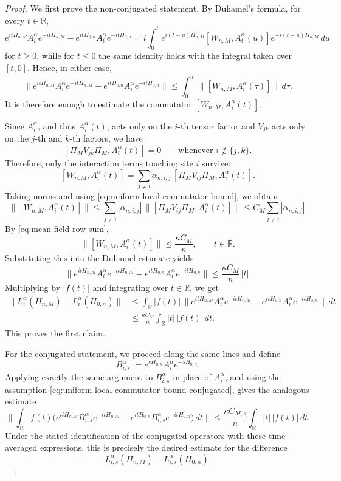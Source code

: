 \documentclass[11pt]{amsart}
\newcommand{\1}{\mathbbm{1}}
\theoremstyle{plain}
\theoremstyle{definition}
\theoremstyle{remark}
\numberwithin{equation}{section}
\begin{document}
\begin{proof}
We first prove the non-conjugated statement. By Duhamel's formula, for every \(t\in\mathbb R\),
\[
e^{itH_{n,M}}A_i^\alpha e^{-itH_{n,M}}-e^{itH_{0,n}}A_i^\alpha e^{-itH_{0,n}}
=
i\int_0^t e^{i(t-u)H_{n,M}}[W_{n,M},A_i^\alpha(u)]e^{-i(t-u)H_{n,M}}\,du
\]
for \(t\ge 0\), while for \(t\le 0\) the same identity holds with the integral taken over \([t,0]\). Hence, in either case,
\[
\big\|e^{itH_{n,M}}A_i^\alpha e^{-itH_{n,M}}-e^{itH_{0,n}}A_i^\alpha e^{-itH_{0,n}}\big\|
\le \int_0^{|t|}\big\|[W_{n,M},A_i^\alpha(\tau)]\big\|\,d\tau.
\]
It is therefore enough to estimate the commutator \([W_{n,M},A_i^\alpha(t)]\).

Since \(A_i^\alpha\), and thus \(A_i^\alpha(t)\), acts only on the \(i\)-th tensor factor and \(V_{jk}\) acts only on the \(j\)-th and \(k\)-th factors, we have
\[
[\Pi_MV_{jk}\Pi_M,A_i^\alpha(t)]=0
\qquad\text{whenever }i\notin\{j,k\}.
\]
Therefore, only the interaction terms touching site \(i\) survive:
\[
[W_{n,M},A_i^\alpha(t)]
=
\sum_{j\neq i}\alpha_{n,i,j}
\,[\Pi_MV_{ij}\Pi_M,A_i^\alpha(t)].
\]
Taking norms and using \eqref{eq:uniform-local-commutator-bound}, we obtain
\[
\big\|[W_{n,M},A_i^\alpha(t)]\big\|
\le
\sum_{j\neq i}|\alpha_{n,i,j}|\,
\big\|[\Pi_MV_{ij}\Pi_M,A_i^\alpha(t)]\big\|
\le
C_M\sum_{j\neq i}|\alpha_{n,i,j}|.
\]
By \eqref{eq:mean-field-row-sum},
\[
\big\|[W_{n,M},A_i^\alpha(t)]\big\|
\le \frac{\kappa C_M}{n},
\qquad t\in\mathbb R.
\]
Substituting this into the Duhamel estimate yields
\[
\big\|e^{itH_{n,M}}A_i^\alpha e^{-itH_{n,M}}-e^{itH_{0,n}}A_i^\alpha e^{-itH_{0,n}}\big\|
\le \frac{\kappa C_M}{n}\,|t|.
\]
Multiplying by \(|f(t)|\) and integrating over \(t\in\mathbb R\), we get
\[
\begin{aligned}
\big\|L_i^\alpha(H_{n,M})-L_i^\alpha(H_{0,n})\big\|
&\le
\int_{\mathbb R}|f(t)|\,
\big\|e^{itH_{n,M}}A_i^\alpha e^{-itH_{n,M}}-e^{itH_{0,n}}A_i^\alpha e^{-itH_{0,n}}\big\|\,dt\\
&\le
\frac{\kappa C_M}{n}\int_{\mathbb R}|t|\,|f(t)|\,dt.
\end{aligned}
\]
This proves the first claim.

For the conjugated statement, we proceed along the same lines and define
\[
B_{i,s}^\alpha:=e^{sH_{0,n}}A_i^\alpha e^{-sH_{0,n}}.
\]
Applying exactly the same argument to \(B_{i,s}^\alpha\) in place of \(A_i^\alpha\), and using the assumption \eqref{eq:uniform-local-commutator-bound-conjugated}, gives the analogous estimate
\[
\Big\|\int_{\mathbb R}f(t)\Big(e^{itH_{n,M}}B_{i,s}^\alpha e^{-itH_{n,M}}
-e^{itH_{0,n}}B_{i,s}^\alpha e^{-itH_{0,n}}\Big)\,dt\Big\|
\le \frac{\kappa C_{M,s}}{n}\int_{\mathbb R}|t|\,|f(t)|\,dt.
\]
Under the stated identification of the conjugated operators with these time-averaged expressions, this is precisely the desired estimate for the difference
\[
L_{i,s}^\alpha(H_{n,M})-L_{i,s}^\alpha(H_{0,n}).
\]
\end{proof}
\end{document}
